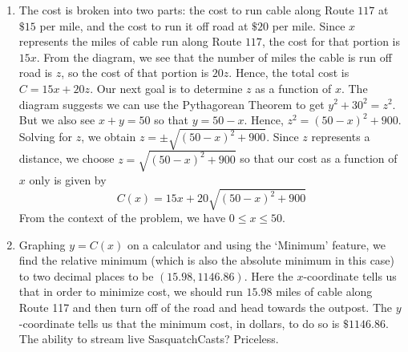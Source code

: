 {
\begin{enumerate}

\item  The cost is broken into two parts:  the cost to run cable along Route $117$ at $\$15$ per mile, and the cost to run it off road at $\$20$ per mile.  Since $x$ represents the miles of cable run along Route $117$, the cost  for that portion is $15x$.  From the diagram, we see that the number of miles the cable is run off road is $z$, so the cost of that portion is $20z$.  Hence, the total cost is $C = 15x + 20z$.  Our next goal is to determine $z$ as a function of $x$.  The diagram suggests we can use the Pythagorean Theorem to get $y^2+30^2 = z^2$.  But we also see $x+y = 50$ so that $y=50-x$.  Hence, $z^2 = (50-x)^2+900$.  Solving for $z$, we obtain $z = \pm \sqrt{(50-x)^2+900}$.  Since $z$ represents a distance, we choose $z = \sqrt{(50-x)^2+900}$ so that our cost as a function of $x$ only is given by \[C(x) = 15x + 20\sqrt{(50-x)^2+900}\] From the context of the problem, we have $0 \leq x \leq 50$.

\item  Graphing $y=C(x)$ on a calculator and using the `Minimum' feature, we find the relative minimum (which is also the absolute minimum in this case) to two decimal places to be $(15.98, 1146.86)$.  Here the $x$-coordinate tells us that in order to minimize cost, we should run $15.98$ miles of cable along Route 117 and then turn off of the road and head towards the outpost. The $y$-coordinate tells us that the minimum cost, in dollars, to do so is $\$1146.86$.  The ability to stream live SasquatchCasts?  Priceless. 
\end{enumerate}
}

